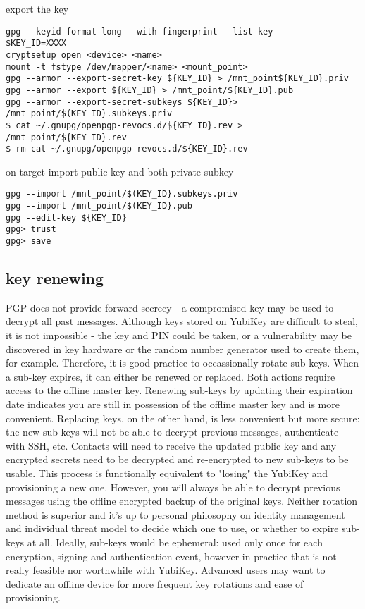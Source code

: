 export the key 
\begin{verbatim}
gpg --keyid-format long --with-fingerprint --list-key
$KEY_ID=XXXX
cryptsetup open <device> <name>
mount -t fstype /dev/mapper/<name> <mount_point>
gpg --armor --export-secret-key ${KEY_ID} > /mnt_point${KEY_ID}.priv
gpg --armor --export ${KEY_ID} > /mnt_point/${KEY_ID}.pub
gpg --armor --export-secret-subkeys ${KEY_ID}> /mnt_point/$(KEY_ID}.subkeys.priv 
$ cat ~/.gnupg/openpgp-revocs.d/${KEY_ID}.rev > /mnt_point/${KEY_ID}.rev
$ rm cat ~/.gnupg/openpgp-revocs.d/${KEY_ID}.rev
\end{verbatim}


on target import public key and both private subkey
\begin{verbatim}
gpg --import /mnt_point/$(KEY_ID}.subkeys.priv 
gpg --import /mnt_point/$(KEY_ID}.pub 
gpg --edit-key ${KEY_ID} 
gpg> trust
gpg> save
\end{verbatim}

\subsection{key renewing}

PGP does not provide forward secrecy - a compromised key  may be used to decrypt all past messages. Although keys stored on  YubiKey are difficult to steal, it is not impossible - the key and PIN  could be taken, or a vulnerability may be discovered in key hardware or  the random number generator used to create them, for example. Therefore,  it is good practice to occassionally rotate sub-keys.
When a sub-key expires, it can either be renewed or  replaced. Both actions require access to the offline master key.  Renewing sub-keys by updating their expiration date indicates you are  still in possession of the offline master key and is more convenient.
Replacing keys, on the other hand, is less convenient but more secure: the new sub-keys will not  be able to decrypt previous messages, authenticate with SSH, etc.  Contacts will need to receive the updated public key and any encrypted  secrets need to be decrypted and re-encrypted to new sub-keys to be  usable. This process is functionally equivalent to "losing" the YubiKey  and provisioning a new one. However, you will always be able to decrypt  previous messages using the offline encrypted backup of the original  keys.
Neither rotation method is superior and it's up to  personal philosophy on identity management and individual threat model  to decide which one to use, or whether to expire sub-keys at all.  Ideally, sub-keys would be ephemeral: used only once for each  encryption, signing and authentication event, however in practice that  is not really feasible nor worthwhile with YubiKey. Advanced users may  want to dedicate an offline device for more frequent key rotations and  ease of provisioning.




